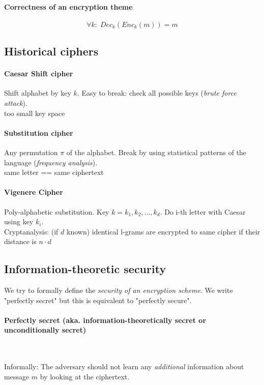 \paragraph{Correctness of an encryption theme}
$$\forall k: \; Dec_k(Enc_k(m)) = m$$


\subsection{Historical ciphers}

\paragraph{Caesar Shift cipher} Shift alphabet by key $k$. Easy to break: check all possible keys (\textit{brute force attack}). \\
\mbox{\Lightning} too small key space

\paragraph{Substitution cipher} Any permutation $\pi$ of the alphabet. Break by using statistical patterns of the language (\textit{frequency analysis}). \\
\mbox{\Lightning} same letter == same ciphertext

\paragraph{Vigenere Cipher} Poly-alphabetic substitution. Key $k=k_1,k_2,..., k_d$. Do i-th letter with Caesar using key $k_i$. \\
Cryptanalysis: (if $d$ known) identical l-grams are encrypted to same cipher if their distance is $n \cdot d$


\subsection{Information-theoretic security}

We try to formally define the \textit{security of an encryption scheme}. We write "perfectly secret" but this is equivalent to "perfectly secure".

\paragraph{Perfectly secret (aka. information-theoretically secret or unconditionally secret)} ~

Informally: The adversary should not learn any \textit{additional} information about message $m$ by looking at the ciphertext.

